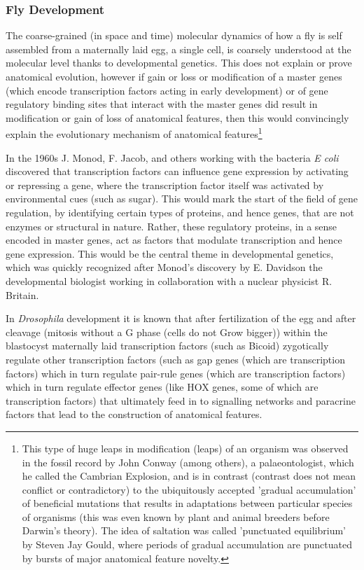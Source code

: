 \subsubsection{Fly Development}

The coarse-grained (in space and time) molecular dynamics of how a fly is self assembled from a maternally laid egg, a single cell, is coarsely understood at the molecular level thanks to developmental genetics.  This does not explain or prove anatomical evolution, however if gain or loss or modification of a master genes (which encode transcription factors acting in early development) or of gene regulatory binding sites that interact with the master genes did result in modification or gain of loss of anatomical features, then this would convincingly explain the evolutionary mechanism of anatomical features\footnote{This type of huge leaps in modification (leaps) of an organism was observed in the fossil record by John Conway (among others), a palaeontologist, which he called the Cambrian Explosion, and is in contrast (contrast does not mean conflict or contradictory) to the ubiquitously accepted 'gradual accumulation' of beneficial mutations that results in adaptations between particular species of organisms (this was even known by plant and animal breeders before Darwin's theory).  The idea of saltation was called 'punctuated equilibrium' by Steven Jay Gould, where periods of gradual accumulation are punctuated by bursts of major anatomical feature novelty.}  

In the 1960s J. Monod, F. Jacob, and others working with the bacteria \textit{E coli} discovered that transcription factors can influence gene expression by activating or repressing a gene, where the transcription factor itself was activated by environmental cues (such as sugar)\cite{pmid13718526}.  This would mark the start of the field of gene regulation, by identifying certain types of proteins, and hence genes, that are not enzymes or structural in nature.  Rather, these regulatory proteins, in a sense encoded in master genes, act as factors that modulate transcription and hence gene expression.  This would be the central theme in developmental genetics, which was quickly recognized after Monod's discovery by E. Davidson the developmental biologist working in collaboration with a nuclear physicist R. Britain\cite{pmid5160087}.     


In \textit{Drosophila} development it is known that after fertilization of the egg and after cleavage (mitosis without a G phase (cells do not Grow bigger)) within the blastocyst maternally laid transcription factors (such as Bicoid) zygotically regulate other transcription factors (such as gap genes (which are transcription factors) which in turn regulate pair-rule genes (which are transcription factors) which in turn regulate effector genes (like HOX genes, some of which are transcription factors) that ultimately feed in to signalling networks and paracrine factors that lead to the construction of anatomical features.  

